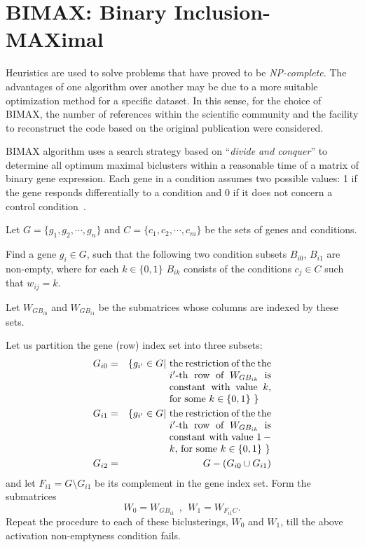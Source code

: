 \documentclass[a4paper,conference]{IEEEtran}
\begin{document}
\section{BIMAX: Binary Inclusion-MAXimal}\label{sc.4}

Heuristics are used to solve problems that have proved to be \textit{NP-complete}. The advantages of one algorithm over another may be due to a more suitable optimization method for a specific dataset. In this sense, for the choice of BIMAX, the number of references within the scientific community and the facility to reconstruct the code based on the original publication were considered.

BIMAX algorithm uses a search strategy based on ``\textit{divide and conquer}'' to determine all optimum maximal biclusters within a reasonable time of a matrix of binary gene expression. Each gene in a condition assumes two possible values: 1 if the gene responds differentially to a condition and 0 if it does not concern a control condition~\cite{prelic2006systematic}.

Let  $G=\{g_1, g_2, \cdots, g_n\}$ and $C=\{c_1, c_2, \cdots, c_m\}$ be the sets of genes and conditions. 

Find a gene $g_i\in G$, such that the following two condition subsets $B_{i0}$, $B_{i1}$ are non-empty,  where for each $k\in\{0,1\}$ $B_{ik}$ consists of the conditions $c_j\in C$ such that $w_{ij}=k$. 

Let $W_{GB_{i0}}$ and $W_{GB_{i1}}$ be the submatrices whose columns are indexed by these sets.  

Let us partition the gene (row) index set into three subsets:
\begin{eqnarray*}
 G_{i0} &=& \{g_{i'}\in G|\ \mbox{\begin{minipage}[t]{.3\textwidth}
 the restriction of the the $i'$-th row of $W_{GB_{ik}}$ is constant with value $k$, for some $k\in\{0,1\}$
 $\}$
\end{minipage}} \\ 
 G_{i1} &=& \{g_{i'}\in G|\ \mbox{\begin{minipage}[t]{.3\textwidth}
 the restriction of the the $i'$-th row of $W_{GB_{ik}}$ is constant with value $1-k$, for some $k\in\{0,1\}$
 $\}$
\end{minipage}} \\ 
 G_{i2} &=& G-(G_{i0} \cup G_{i1} )
\end{eqnarray*}
and let $F_{i1} = G \setminus  G_{i1}$ be its complement in the gene index set. Form the submatrices
$$W_{0} = W_{GB_{i1}} \ \  , \ \   W_{1} = W_{F_{i1}C}.$$
Repeat the procedure to each of these biclusterings, $W_0$ and $W_1$, till the above activation non-emptyness condition fails.
\end{document}

